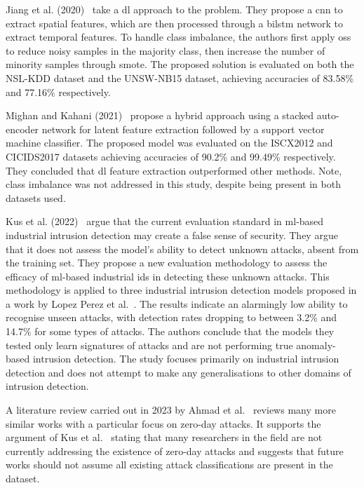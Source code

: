 Jiang et al. (2020)~\cite{Jiang} take a \gls{dl} approach to the problem. They
propose a \gls{cnn} to extract spatial features, which are then processed
through a \gls{bilstm} network to extract temporal features. To handle class
imbalance, the authors first apply \gls{oss} to reduce noisy samples in the
majority class, then increase the number of minority samples through
\gls{smote}. The proposed solution is evaluated on both the NSL-KDD dataset and
the UNSW-NB15 dataset, achieving accuracies of 83.58\% and 77.16\%
respectively.

Mighan and Kahani (2021)~\cite{Mighan} propose a hybrid approach using a
stacked auto-encoder network for latent feature extraction followed by a
support vector machine classifier. The proposed model was evaluated on the
ISCX2012 and CICIDS2017 datasets achieving accuracies of 90.2\% and 99.49\%
respectively. They concluded that \gls{dl} feature extraction outperformed
other methods. Note, class imbalance was not addressed in this study, despite
being present in both datasets used.

Kus et al. (2022)~\cite{Kus} argue that the current evaluation standard in
\gls{ml}-based industrial intrusion detection may create a false sense of
security. They argue that it does not assess the model's ability to detect
unknown attacks, absent from the training set. They propose a new evaluation
methodology to assess the efficacy of \gls{ml}-based industrial \gls{ids} in
detecting these unknown attacks. This methodology is applied to three
industrial intrusion detection models proposed in a work by Lopez Perez et
al.~\cite{Perez}. The results indicate an alarmingly low ability to recognise
unseen attacks, with detection rates dropping to between 3.2\% and 14.7\% for
some types of attacks. The authors conclude that the models they tested only
learn signatures of attacks and are not performing true anomaly-based intrusion
detection. The study focuses primarily on industrial intrusion detection and
does not attempt to make any generalisations to other domains of intrusion
detection.

A literature review carried out in 2023 by Ahmad et al.~\cite{zero-day} reviews
many more similar works with a particular focus on zero-day attacks. It
supports the argument of Kus et al.~\cite{Kus} stating that many researchers in
the field are not currently addressing the existence of zero-day attacks and
suggests that future works should not assume all existing attack
classifications are present in the dataset.

